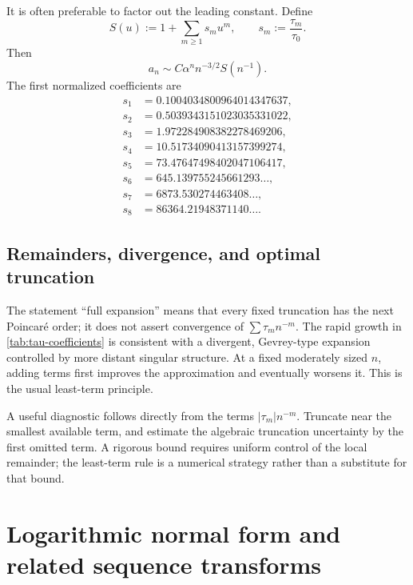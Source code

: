 \documentclass[11pt,oneside]{article}
\numberwithin{equation}{section}
\theoremstyle{plain}
\theoremstyle{definition}
\theoremstyle{remark}
\begin{document}
It is often preferable to factor out the leading constant.  Define
\begin{equation}\label{eq:S-def}
 S(u):=1+\sum_{m\ge1}s_mu^m,
 \qquad s_m:=\frac{\tau_m}{\tau_0}.
\end{equation}
Then
\begin{equation}\label{eq:normalized-forward}
 \boxed{
 a_n\sim C\alpha^n n^{-3/2}S(n^{-1}).}
\end{equation}
The first normalized coefficients are
\begin{align*}
 s_1&=0.1004034800964014347637,\\
 s_2&=0.5039343151023035331022,\\
 s_3&=1.972284908382278469206,\\
 s_4&=10.51734090413157399274,\\
 s_5&=73.47647498402047106417,\\
 s_6&=645.139755245661293\ldots,\\
 s_7&=6873.530274463408\ldots,\\
 s_8&=86364.21948371140\ldots.
\end{align*}

\subsection{Remainders, divergence, and optimal truncation}

The statement ``full expansion'' means that every fixed truncation has the
next Poincar\'e order; it does not assert convergence of
$\sum\tau_mn^{-m}$.  The rapid growth in \cref{tab:tau-coefficients} is
consistent with a divergent, Gevrey-type expansion controlled by more distant
singular structure.  At a fixed moderately sized $n$, adding terms first
improves the approximation and eventually worsens it.  This is the usual
least-term principle.

A useful diagnostic follows directly from the terms
$|\tau_m|n^{-m}$.  Truncate near the smallest available term, and estimate
the algebraic truncation uncertainty by the first omitted term.  A rigorous
bound requires uniform control of the local remainder; the least-term rule is
a numerical strategy rather than a substitute for that bound.

\section{Logarithmic normal form and related sequence transforms}\label{sec:lognormal}
\end{document}
